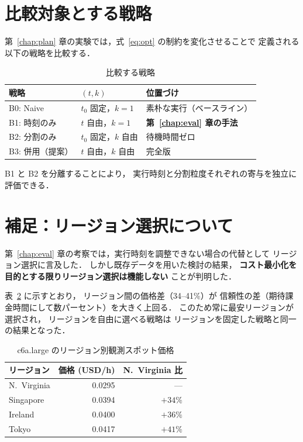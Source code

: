 \documentclass[11pt,a4paper]{ltjsreport}
\begin{document}
\section{比較対象とする戦略}

第~\ref{chap:plan} 章の実験では，式~\eqref{eq:opt} の制約を変化させることで
定義される以下の戦略を比較する．

\begin{table}[htbp]
\centering
\caption{比較する戦略}
\label{tab:strategies}
\small
\begin{tabularx}{\textwidth}{@{}llX@{}}
\toprule
戦略 & $(t, k)$ & 位置づけ \\
\midrule
B0: Naive        & $t_0$ 固定，$k{=}1$ & 素朴な実行（ベースライン） \\
B1: 時刻のみ     & $t$ 自由，$k{=}1$   & \textbf{第~\ref{chap:eval} 章の手法} \\
B2: 分割のみ     & $t_0$ 固定，$k$ 自由 & 待機時間ゼロ \\
B3: 併用（提案） & $t$ 自由，$k$ 自由   & 完全版 \\
\bottomrule
\end{tabularx}
\end{table}

B1 と B2 を分離することにより，
実行時刻と分割粒度それぞれの寄与を独立に評価できる．

\section{補足：リージョン選択について}

第~\ref{chap:eval} 章の考察では，実行時刻を調整できない場合の代替として
リージョン選択に言及した．
しかし既存データを用いた検討の結果，
\textbf{コスト最小化を目的とする限りリージョン選択は機能しない}
ことが判明した．

表~\ref{tab:region_price} に示すとおり，
リージョン間の価格差（34--41\%）が
信頼性の差（期待課金時間にして数パーセント）を大きく上回る．
このため常に最安リージョンが選択され，
リージョンを自由に選べる戦略は
リージョンを固定した戦略と同一の結果となった．

\begin{table}[htbp]
\centering
\caption{c6a.large のリージョン別観測スポット価格}
\label{tab:region_price}
\small
\begin{tabular}{@{}lrr@{}}
\toprule
リージョン & 価格 (USD/h) & N.~Virginia 比 \\
\midrule
N.~Virginia & 0.0295 & --- \\
Singapore   & 0.0394 & $+34\%$ \\
Ireland     & 0.0400 & $+36\%$ \\
Tokyo       & 0.0417 & $+41\%$ \\
\bottomrule
\end{tabular}
\end{table}
\end{document}
